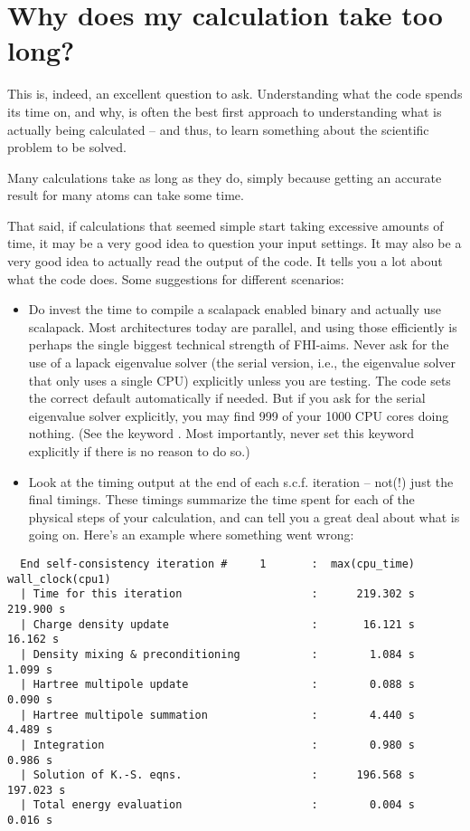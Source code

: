 \section{Why does my calculation take too long?}

This is, indeed, an excellent question to ask. Understanding what the
code spends its time on, and why, is often the best first approach to
understanding what is actually being calculated -- and thus, to learn
something about the scientific problem to be solved.

Many calculations take as long as they do, simply because getting an
accurate result for many atoms can take some time.

That said, if calculations that seemed simple start taking
excessive amounts of time, it may be a very good idea to question your
input settings. It may also be a very good idea to actually read the
output of the code. It tells you a lot about what the code
does. Some suggestions for different scenarios:

\begin{itemize}
  \item Do invest the time to compile a scalapack enabled binary and
    actually use scalapack. Most architectures today are parallel, and
    using those efficiently is perhaps the single biggest technical
    strength of FHI-aims. Never 
    ask for the use of a lapack eigenvalue solver (the serial version,
    i.e., the eigenvalue solver that only uses a single CPU)
    explicitly unless you are testing. The code sets the correct default
    automatically if needed. But if you ask for the serial eigenvalue
    solver explicitly, you may find 999 of your 1000 CPU cores doing
    nothing. (See the keyword . Most importantly,
    never set this keyword explicitly if there is no reason to do so.)  
  \item Look at the timing output at the end of each
    s.c.f. iteration -- not(!) just the final timings. These timings
    summarize the time spent for each of the physical steps of your
    calculation, and can tell you a 
    great deal about what is going on. Here's an example where something went wrong:
\end{itemize}
\small
\begin{verbatim}
  End self-consistency iteration #     1       :  max(cpu_time)    wall_clock(cpu1)
  | Time for this iteration                    :      219.302 s         219.900 s
  | Charge density update                      :       16.121 s          16.162 s
  | Density mixing & preconditioning           :        1.084 s           1.099 s
  | Hartree multipole update                   :        0.088 s           0.090 s
  | Hartree multipole summation                :        4.440 s           4.489 s
  | Integration                                :        0.980 s           0.986 s
  | Solution of K.-S. eqns.                    :      196.568 s         197.023 s
  | Total energy evaluation                    :        0.004 s           0.016 s
\end{verbatim}
\normalsize

